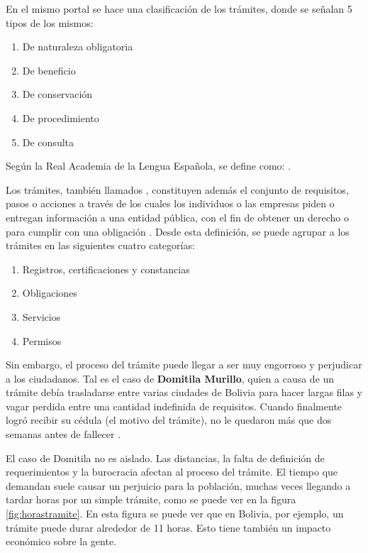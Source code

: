 En el mismo portal se hace una clasificación de los trámites, donde se señalan 5 tipos de los mismos:

\begin{enumerate}
    \item De naturaleza obligatoria
    \item De beneficio
    \item De conservación
    \item De procedimiento
    \item De consulta
\end{enumerate}

Según la Real Academia de la Lengua Española, se define como: 
 \parencite{asaleDiccionarioLenguaEspanola}.

Los trámites, también llamados , constituyen además 
el conjunto de requisitos, pasos o acciones a través de los cuales los individuos o las empresas piden o entregan información a una entidad pública, con el fin de obtener un derecho o para cumplir con una obligación \cite[36]{rosethFinTramiteEterno2018}. 
Desde esta definición, se puede agrupar a los trámites en las siguientes cuatro categorías:

\begin{enumerate}
    \item Registros, certificaciones y constancias
    \item Obligaciones
    \item Servicios
    \item Permisos
\end{enumerate}

Sin embargo, el proceso del trámite puede llegar a ser muy engorroso y perjudicar a los ciudadanos.
Tal es el caso de \textbf{Domitila Murillo}, quien a causa de un trámite debía trasladarse entre varias ciudades de Bolivia para hacer largas filas y vagar perdida entre una cantidad indefinida de requisitos. 
Cuando finalmente logró recibir su cédula (el motivo del trámite), no le quedaron más que dos semanas antes de fallecer \cite{charoskyQuejaComoEnergia2014}.

El caso de Domitila no es aislado. 
Las distancias, la falta de definición de requerimientos y la burocracia afectan al proceso del trámite. 
El tiempo que demandan suele causar un perjuicio para la población, muchas veces llegando a tardar horas por un simple trámite, como se puede ver en la figura \ref{fig:horastramite}.
En esta figura se puede ver que en Bolivia, por ejemplo, un trámite puede durar alrededor de 11 horas. Esto tiene también un impacto económico sobre la gente. 

